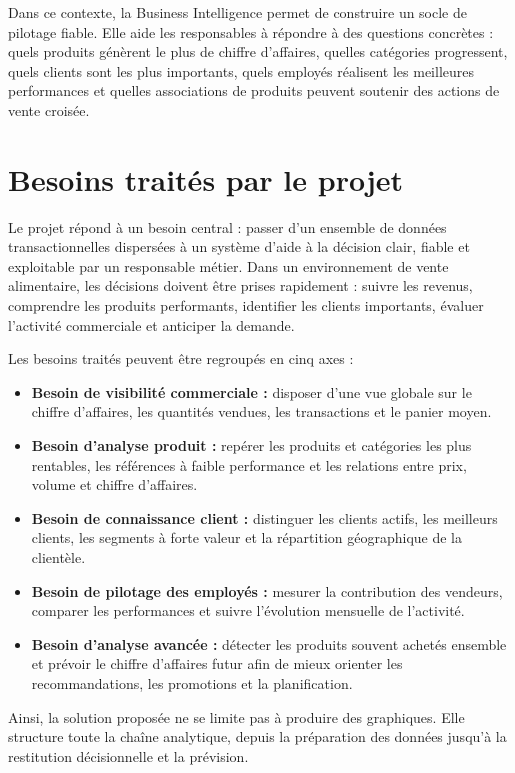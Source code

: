 \documentclass[12pt,a4paper,twoside]{report}
\begin{document}
Dans ce contexte, la Business Intelligence permet de construire un socle de pilotage fiable. Elle aide les responsables à répondre à des questions concrètes : quels produits génèrent le plus de chiffre d'affaires, quelles catégories progressent, quels clients sont les plus importants, quels employés réalisent les meilleures performances et quelles associations de produits peuvent soutenir des actions de vente croisée.

\section{Besoins traités par le projet}

Le projet répond à un besoin central : passer d'un ensemble de données transactionnelles dispersées à un système d'aide à la décision clair, fiable et exploitable par un responsable métier. Dans un environnement de vente alimentaire, les décisions doivent être prises rapidement : suivre les revenus, comprendre les produits performants, identifier les clients importants, évaluer l'activité commerciale et anticiper la demande.

Les besoins traités peuvent être regroupés en cinq axes :

\begin{itemize}
  \item \textbf{Besoin de visibilité commerciale :} disposer d'une vue globale sur le chiffre d'affaires, les quantités vendues, les transactions et le panier moyen.
  \item \textbf{Besoin d'analyse produit :} repérer les produits et catégories les plus rentables, les références à faible performance et les relations entre prix, volume et chiffre d'affaires.
  \item \textbf{Besoin de connaissance client :} distinguer les clients actifs, les meilleurs clients, les segments à forte valeur et la répartition géographique de la clientèle.
  \item \textbf{Besoin de pilotage des employés :} mesurer la contribution des vendeurs, comparer les performances et suivre l'évolution mensuelle de l'activité.
  \item \textbf{Besoin d'analyse avancée :} détecter les produits souvent achetés ensemble et prévoir le chiffre d'affaires futur afin de mieux orienter les recommandations, les promotions et la planification.
\end{itemize}

Ainsi, la solution proposée ne se limite pas à produire des graphiques. Elle structure toute la chaîne analytique, depuis la préparation des données jusqu'à la restitution décisionnelle et la prévision.
\end{document}
